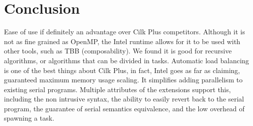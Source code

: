 \documentclass[a4paper,10pt,openright,openbib,twocolumn]{article}
\begin{document}
\section{Conclusion} \label{conc}

Ease of use if definitely an advantage over Cilk Plus competitors. Although it is not as fine grained as OpenMP, the Intel runtime allows for it to be used with other tools, such as TBB (composability). We found it is good for recursive algorithms, or algorithms that can be divided in tasks. Automatic load balancing is one of the best things about Cilk Plus, in fact, Intel goes as far as claiming, guaranteed maximum memory usage scaling. It simplifies adding parallelism to existing serial programs. Multiple attributes of the extensions support this, including the non intrusive syntax, the ability to easily revert back to the serial program, the guarantee of serial semantics equivalence, and the low overhead of spawning a task.
\end{document}
